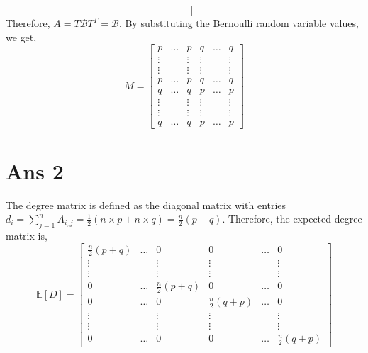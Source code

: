 \documentclass[10pt]{article}
\begin{document}
\begin{flushleft}
$$\begin{bmatrix}
\end{bmatrix}
$$
Therefore, $A = T\mathcal{B}T^{T} = \mathcal{B}$. By substituting the Bernoulli random variable values, we get, \\
\vspace{0.5em}
$$ M = 
\begin{bmatrix} 
p & \hdots & p & q & \hdots & q\\
\vdots & & \vdots & \vdots & & \vdots\\
\vdots & & \vdots & \vdots & & \vdots\\
p & \hdots & p & q & \hdots & q\\
q & \hdots & q & p & \hdots & p\\ 
\vdots & & \vdots & \vdots & & \vdots\\
\vdots & & \vdots & \vdots & & \vdots\\
q & \hdots & q & p & \hdots & p
\end{bmatrix}
$$
\end{flushleft}
\section*{Ans 2}
\begin{flushleft}
The degree matrix is defined as the diagonal matrix with entries $d_{i} = \sum_{j=1}^{n} A_{i,j} = \frac{1}{2} (n \times p + n \times q) = \frac{n}{2}(p+q)$. Therefore, the expected degree matrix is,\\
\vspace{0.5em}
$$ \mathbb{E}[D] = 
\begin{bmatrix} 
\frac{n}{2}(p+q) & \hdots & 0 & 0 & \hdots & 0\\
\vdots & & \vdots & \vdots & & \vdots\\
\vdots & & \vdots & \vdots & & \vdots\\
0 & \hdots & \frac{n}{2}(p+q) & 0 & \hdots & 0\\
0 & \hdots & 0 & \frac{n}{2}(q+p) & \hdots & 0\\ 
\vdots & & \vdots & \vdots & & \vdots\\
\vdots & & \vdots & \vdots & & \vdots\\
0 & \hdots & 0 & 0 & \hdots & \frac{n}{2}(q+p)
\end{bmatrix}
$$
\end{flushleft}
\end{document}
